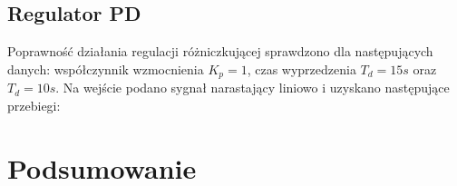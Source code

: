 \documentclass[12pt]{article}
\begin{document}

\subsection{Regulator PD}
Poprawność działania regulacji różniczkującej sprawdzono dla następujących danych: współczynnik wzmocnienia $K_p=1$, czas wyprzedzenia $T_d = 15s$ oraz $T_d = 10s$. Na wejście podano sygnał narastający liniowo i uzyskano następujące przebiegi:


\section{Podsumowanie}
\end{document}
